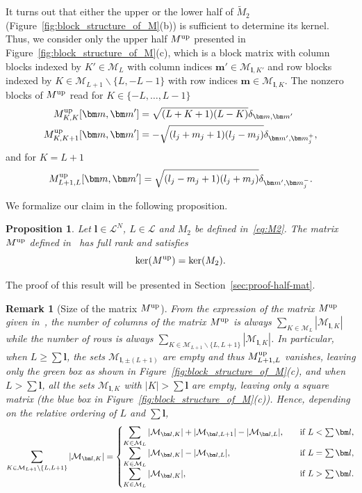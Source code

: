 \documentclass{article}
\newcommand{\card}[1]{|{#1}|}
\newtheorem{proposition}[theorem]{Proposition}
\newtheorem{remark}[theorem]{Remark}
\numberwithin{equation}{section}
\def\bl{{\bm l}}
\def\bbm{{\bm m}}
\def\calM{\mathcal{M}}
\def\calL{\mathcal{L}}
\def\MlL{{M}}
\def\Mup{{\MlL}^{\textup{up}}}
\begin{document}
It turns out that either the upper or the lower half of $\widetilde{\MlL}_2$ (Figure~\ref{fig:block_structure_of_M}(b)) is sufficient to determine its kernel. 
Thus, we consider only the upper half $\Mup$ presented in Figure~\ref{fig:block_structure_of_M}(c), which is a block matrix with column blocks indexed by $K'\in\calM_L$ with column indices $\bbm'\in\calM_{\bl,K'}$ and row blocks indexed by 
 $K\in
    \calM_{L+1}\backslash \{L,-L-1\}
$
with row indices $\bbm\in\calM_{\bl,K}$. 
The nonzero blocks of $\Mup$ read 
for $K\in \{-L, \ldots, L-1\}$
\begin{align}
    \Mup_{K,K}[\bbm,\bbm'] &= \sqrt{(L+K+1)(L-K)}\delta_{\bbm,\bbm'} \label{eq:MKK}\\
    \Mup_{K,K+1}[\bbm,\bbm'] &= 
    -\sqrt{(l_j+m_j+1)(l_j-m_j)}\delta_{\bbm',\bbm_j^+},
\end{align}
and for $K = L+1$ 
\begin{equation}\label{eq:MLpL}
    \Mup_{L+1,L}[\bbm,\bbm'] = 
    \sqrt{(l_j- m_j+1)(l_j+  m_j)}\delta_{\bbm',\bbm_j^-}.
\end{equation}

We formalize our claim in the following proposition.

\begin{proposition}\label{prop:ker-M2-GE}
Let $\bl\in\calL^N$, $L \in \calL$ and $\MlL_2$ be defined in~\eqref{eq:M2}. 
The matrix $\Mup$ defined in~ has full rank and satisfies
\[
    \ker(\Mup) =  \ker(\MlL_2).
\]
\end{proposition}
The proof of this result will be presented in Section~\ref{sec:proof-half-mat}. 

\begin{remark}[Size of the matrix $\Mup$]\label{remark:size-M2-GE}
From the expression of the matrix $\Mup$ given in~, 
the number of columns of the matrix $\Mup$ is always 
$\displaystyle\sum_{K\in\calM_L}\card{\calM_{\bl,K}}$
while the number of rows is always 
$\displaystyle\sum_{K\in\calM_{L+1} \backslash \{ L, L+1\}}\card{\calM_{\bl,K}}$.
In particular, when $L\ge\sum\bl$, the sets $\calM_{\bl,\pm(L+1)}$ are empty and thus $\Mup_{L+1,L}$ vanishes, leaving only the green box as shown in Figure~\ref{fig:block_structure_of_M}(c), 
and when $L>\sum\bl$, all the sets $\calM_{\bl,K}$ with $|K|>\sum\bl$ are empty, leaving only a square matrix (the blue box in Figure~\ref{fig:block_structure_of_M}(c)).
Hence, depending on the relative ordering of $L$ and $\sum\bl$, 
\begin{equation*}
    \displaystyle\sum_{K\in\calM_{L+1} \backslash \{ L, L+1\}}\card{\calM_{\bl,K}} = 
    \begin{cases}
    \displaystyle {\sum_{K\in\calM_L}\card{\calM_{\bl,K}}} + \card{\calM_{\bl,L+1}}-\card{\calM_{\bl,L}}, & \quad \textup{if }L<\sum\bl, \\
    \displaystyle \sum_{K\in\calM_L}\card{\calM_{\bl,K}}-\card{\calM_{\bl,L}}, & \quad \textup{if }L=\sum\bl, \\
    \displaystyle \sum_{K\in\calM_L}\card{\calM_{\bl,K}}, & \quad \textup{if }L>\sum\bl.
\end{cases}
\end{equation*}
\end{remark}
\end{document}
